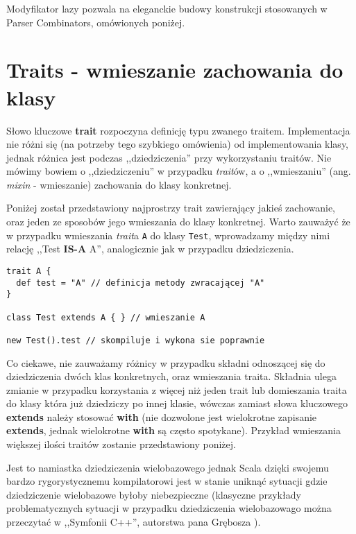 Modyfikator lazy pozwala na eleganckie budowy konstrukcji stosowanych w Parser Combinators, omówionych poniżej.


\section{Traits - wmieszanie zachowania do klasy}
\label{sec:traits}

Słowo kluczowe \textbf{trait} rozpoczyna definicję typu zwanego traitem.
Implementacja nie różni się (na potrzeby tego szybkiego omówienia) od implementowania klasy,
jednak różnica jest podczas ,,dziedziczenia'' przy wykorzystaniu traitów. Nie mówimy bowiem o ,,dziedziczeniu'' 
w przypadku \textit{trait}ów, a o ,,wmieszaniu'' (ang. \textit{mixin} - wmieszanie) zachowania do klasy konkretnej.

Poniżej został przedstawiony najprostrzy trait zawierający jakieś zachowanie, oraz jeden ze sposobów jego wmieszania do klasy konkretnej.
Warto zauważyć że w przypadku wmieszania \textit{trait}a \verb|A| do klasy \verb|Test|, wprowadzamy między nimi relację ,,Test \textbf{IS-A} A'',
analogicznie jak w przypadku dziedziczenia.

\begin{lstlisting}
trait A { 
  def test = "A" // definicja metody zwracającej "A"
}

class Test extends A { } // wmieszanie A

new Test().test // skompiluje i wykona sie poprawnie
\end{lstlisting}

Co ciekawe, nie zauważamy różnicy w przypadku składni odnoszącej się do dziedziczenia dwóch klas konkretnych, oraz wmieszania traita.
Składnia ulega zmianie w przypadku korzystania z więcej niż jeden trait lub domieszania traita do klasy która już dziedziczy po innej klasie,
wówczas zamiast słowa kluczowego \textbf{extends} należy stosować \textbf{with} (nie dozwolone jest wielokrotne zapisanie \textbf{extends},
jednak wielokrotne \textbf{with} są często spotykane). Przykład wmieszania większej ilości traitów zostanie przedstawiony poniżej.

Jest to namiastka dziedziczenia wielobazowego jednak Scala dzięki swojemu bardzo rygorystycznemu kompilatorowi jest w stanie 
uniknąć sytuacji gdzie dziedziczenie wielobazowe byłoby niebezpieczne (klasyczne przykłady 
problematycznych sytuacji w przypadku dziedziczenia wielobazowago można przeczytać w ,,Symfonii C++'', autorstwa pana Grębosza \cite{symfonia}).

